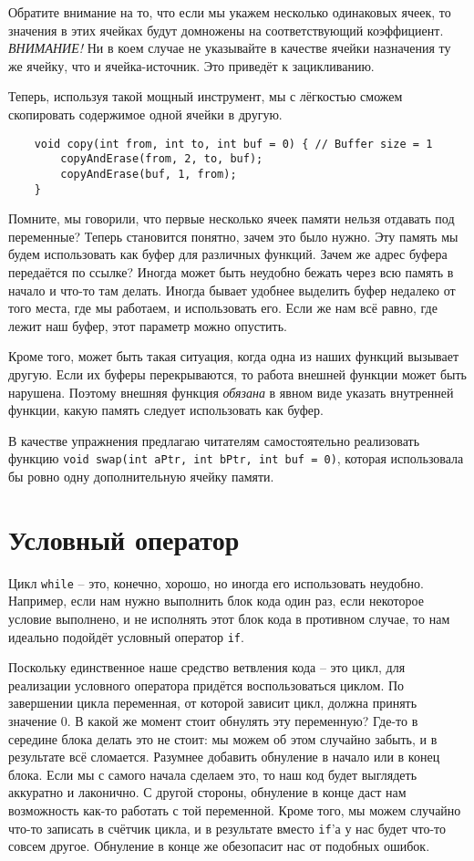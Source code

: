 \documentclass{book}
\begin{document}
Обратите внимание на то, что если мы укажем несколько одинаковых ячеек, то значения в этих ячейках будут
домножены на соответствующий коэффициент. {\em ВНИМАНИЕ!} Ни в коем случае не указывайте в качестве ячейки
назначения ту же ячейку, что и ячейка-источник. Это приведёт к зацикливанию.

Теперь, используя такой мощный инструмент, мы с лёгкостью сможем скопировать содержимое одной ячейки в другую.

\begin{verbatim}
    void copy(int from, int to, int buf = 0) { // Buffer size = 1
        copyAndErase(from, 2, to, buf);
        copyAndErase(buf, 1, from);
    }
\end{verbatim}

Помните, мы говорили, что первые несколько ячеек памяти нельзя отдавать под переменные? Теперь становится
понятно, зачем это было нужно. Эту память мы будем использовать как буфер для различных функций. Зачем же
адрес буфера передаётся по ссылке? Иногда может быть неудобно бежать через всю память в начало и что-то там
делать. Иногда бывает удобнее выделить буфер недалеко от того места, где мы работаем, и использовать его.
Если же нам всё равно, где лежит наш буфер, этот параметр можно опустить.

Кроме того, может быть такая ситуация, когда одна из наших функций вызывает другую. Если их буферы перекрываются,
то работа внешней функции может быть нарушена. Поэтому внешняя функция {\em обязана} в явном виде указать
внутренней функции, какую память следует использовать как буфер.

В качестве упражнения предлагаю читателям самостоятельно реализовать функцию \texttt{void swap(int aPtr, int bPtr,
int buf = 0)}, которая использовала бы ровно одну дополнительную ячейку памяти.

\section{Условный оператор}
Цикл \texttt{while} -- это, конечно, хорошо, но иногда его использовать неудобно. Например, если нам нужно
выполнить блок кода один раз, если некоторое условие выполнено, и не исполнять этот блок кода в противном случае,
то нам идеально подойдёт условный оператор \texttt{if}. 

Поскольку единственное наше средство ветвления кода -- это цикл, для реализации условного оператора придётся
воспользоваться циклом. По завершении цикла переменная, от которой зависит цикл, должна принять значение 0.
В какой же момент стоит обнулять эту переменную? Где-то в середине блока делать это не стоит: мы можем об этом
случайно забыть, и в результате всё сломается. Разумнее добавить обнуление в начало или в конец блока. Если мы с
самого начала сделаем это, то наш код будет выглядеть аккуратно и лаконично. С другой стороны, обнуление в конце
даст нам возможность как-то работать с той переменной. Кроме того, мы можем случайно что-то записать в счётчик
цикла, и в результате вместо \texttt{if}'а у нас будет что-то совсем другое. Обнуление в конце же обезопасит нас
от подобных ошибок.
\end{document}
